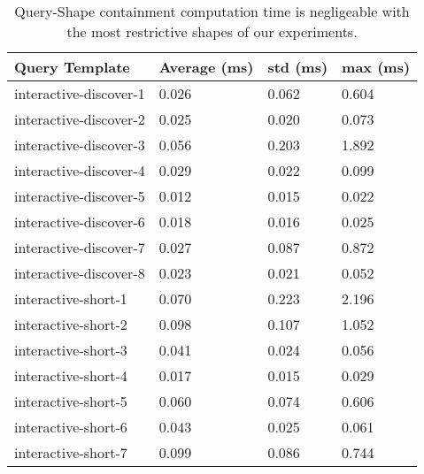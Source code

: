 \begin{table}
	\begin{center}
		\begin{tabular}{|l|l|l|l|}
			\hline
			Query Template & Average (ms) & std (ms) & max (ms) \\
			\hline
			interactive-discover-1 & 0.026 & 0.062 & 0.604 \\
			\hline
			interactive-discover-2 & 0.025 & 0.020 & 0.073 \\
			\hline
			interactive-discover-3 & 0.056 & 0.203 & 1.892 \\
			\hline
			interactive-discover-4 & 0.029 & 0.022 & 0.099 \\
			\hline
			interactive-discover-5 & 0.012 & 0.015 & 0.022 \\
			\hline
			interactive-discover-6 & 0.018 & 0.016 & 0.025 \\
			\hline
			interactive-discover-7 & 0.027 & 0.087 & 0.872 \\
			\hline
			interactive-discover-8 & 0.023 & 0.021 & 0.052 \\
			\hline
			interactive-short-1 & 0.070 & 0.223 & 2.196 \\
			\hline
			interactive-short-2 & 0.098 & 0.107 & 1.052 \\
			\hline
			interactive-short-3 & 0.041 & 0.024 & 0.056 \\
			\hline
			interactive-short-4 & 0.017 & 0.015 & 0.029 \\
			\hline
			interactive-short-5 & 0.060 & 0.074 & 0.606 \\
			\hline
			interactive-short-6 & 0.043 & 0.025 & 0.061 \\
			\hline
			interactive-short-7 & 0.099 & 0.086 & 0.744 \\
			\hline
		\end{tabular}
	\end{center}
	\caption{Query-Shape containment computation time is negligeable with the most restrictive shapes of our experiments.}
	\label{tab:queryShapeContainmentEval}
\end{table}